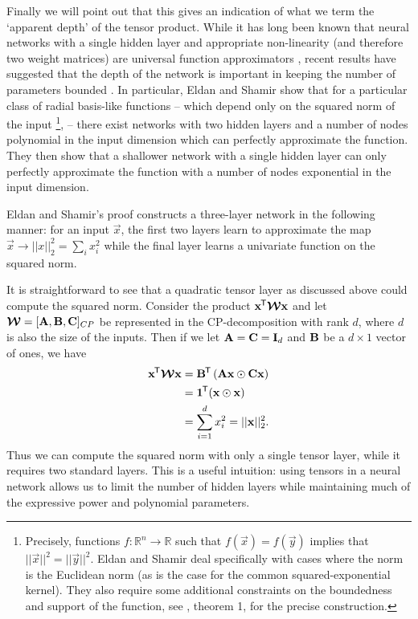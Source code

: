 {%
Finally we will point out that this gives an indication of what we term the `apparent depth' of the
tensor product. While it has long been known that neural networks with a single hidden layer and
appropriate non-linearity (and therefore two weight matrices)
 are universal function approximators \autocite{Hornik1989}, recent results
have suggested that the depth of the network is important in keeping the number of parameters
bounded \autocite{Eldan2016, Telgarsky2016}. In particular, Eldan and Shamir show that for a
particular class of radial basis-like functions -- which depend only on the squared norm of the 
input
\footnote{Precisely, functions \(f : \mathbb{R}^n \to \mathbb{R}\) such that
\(f(\vec{x}) = f(\vec{y})\) implies that \(||\vec{x}||^2 = ||\vec{y}||^2\). Eldan and Shamir
deal specifically with cases where the norm is the Euclidean norm (as is the case for the
common squared-exponential kernel). They also
require some additional constraints on the boundedness and support of the function, see
\autocite{Eldan2016}, theorem 1, for the precise construction.}, --
there exist networks with two hidden layers and a number of nodes polynomial in the input dimension
which can perfectly approximate the function. They then show that a shallower network with a single
hidden layer can only perfectly approximate the function with a number of nodes exponential in the
input dimension. \autocite{Eldan2016}

Eldan and Shamir's proof constructs a three-layer network in the following manner:
for an input \(\vec{x}\), the first two layers learn to approximate the map 
\(\vec{x}\to ||x||^2_2 = \sum_i x_i^2\) while the final layer learns a univariate function on the
squared norm. \autocite{Eldan2016}
 
It is straightforward to see that a quadratic tensor layer as discussed above could compute the
squared norm. Consider the product \(\mathbf{x}^{\mkern-1.5mu\mathsf{T}}\bm{\mathcal{W}}\mathbf{x}\) and let 
\(\bm{\mathcal{W}} = [\mathbf{A},\mathbf{B},\mathbf{C}]_{CP}\) be represented in the CP-decomposition with
rank \(d\), where \(d\) is also the size of the inputs. Then if we let 
\(\mathbf{A}=\mathbf{C}=\mathbf{I}_d\) and \(\mathbf{B}\) be a \(d \times 1\) vector of ones,
we have
\begin{align}
	\mathbf{x}^{\mkern-1.5mu\mathsf{T}}\bm{\mathcal{W}}\mathbf{x} 
	&= \mathbf{B}^{\mkern-1.5mu\mathsf{T}}\left(\mathbf{A}\mathbf{x} \odot \mathbf{C}\mathbf{x}\right)\\
	&= \mathbf{1}^{\mkern-1.5mu\mathsf{T}}(\mathbf{x} \odot \mathbf{x})\\
	&= \sum_{i=1}^d x_i^2 = ||\mathbf{x}||^2_2.
\end{align} Thus we can compute the squared norm with only a single tensor layer, while it requires
two standard layers. This is a useful intuition: using tensors in a neural network allows us to
limit the number of hidden layers while maintaining much of the expressive power and polynomial
parameters.

}

